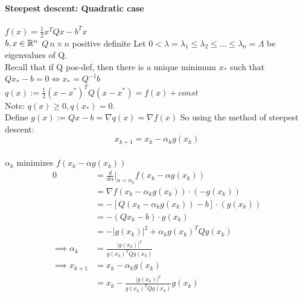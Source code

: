 \documentclass[11pt]{article}
\begin{document}
\paragraph{Steepest descent: Quadratic case}
$f(x) = \frac{1}{2} x^T Q x - b^T x$ \\
$b, x \in \mathbb{R}^n$ $Q \, n \times n$ positive definite
Let $0 < \lambda = \lambda_1 \leq \lambda_2 \leq \hdots \leq \lambda_n = \Lambda$ be eigenvalues of Q. \\
Recall that if Q pos-def, then there is a unique minimum $x_*$ such that $Qx_* - b = 0 \iff  x_* = Q^{-1}b$\\
$q(x) := \frac{1}{2}(x - x^*)^TQ(x - x^*) = f(x) + const$ \\
Note: $q(x) \geq 0, q(x_*) = 0$. \\
Define $g(x) := Qx - b  = \nabla q(x) = \nabla f(x)$
So using the method of steepest descent: 
$$x_{k+1} = x_k - \alpha_k g(x_k)$$
 \\
$\alpha_k$ minimizes $f(x_k - \alpha g(x_k))$
\begin{align}
	0 &= \frac{d}{d\alpha}|_{\alpha = \alpha_k} f(x_k - \alpha g(x_k)) \\
	&= \nabla f(x_k - \alpha_k g(x_k)) \cdot (-g(x_k)) \\
	&= - [Q (x_k - \alpha_k g(x_k)) - b] \cdot (g(x_k)) \\
	&= -(Q x_k - b) \cdot g(x_k) \\
	&= - |g(x_k)|^2 + \alpha_k g(x_k)^T Q g(x_k) \\
	\implies \alpha_k &= \frac{|g(x_k)|^2}{g(x_k)^TQg(x_k)}\\
	\implies x_{k+1} &= x_k - \alpha_k g(x_k) \\
	&= x_k - \frac{|g(x_k)|^2}{g(x_k)^T Q g(x_k)} g(x_k)
\end{align}
\end{document}
